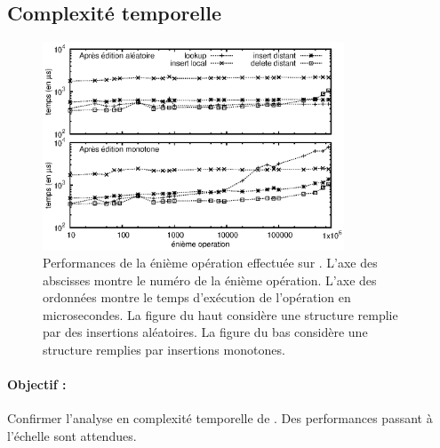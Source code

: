 \subsection{Complexité temporelle}

\begin{figure}
  \begin{center}
    \includegraphics[width=0.8\textwidth]{img/lseq/time.eps}
    \caption[Performances de \LSEQ] {\label{repl:img:time} Performances de la
      énième opération effectuée sur \LSEQ. L'axe des abscisses montre le numéro
      de la énième opération. L'axe des ordonnées montre le temps d'exécution de
      l'opération en microsecondes. La figure du haut considère une structure
      remplie par des insertions aléatoires. La figure du bas considère une
      structure remplies par insertions monotones.}
  \end{center}
\end{figure}

\paragraph{Objectif :} Confirmer l'analyse en complexité temporelle de
\LSEQ. Des performances passant à l'échelle sont attendues.

